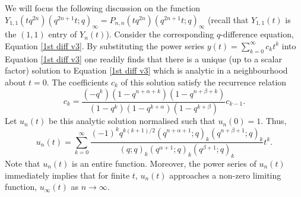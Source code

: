 \documentclass[a4paper,reqno]{amsart}
\numberwithin{equation}{section}
\numberwithin{figure}{section}
\begin{document}
We will focus the following discussion on the function $Y_{1,1}(tq^{2n})(q^{2n+1}t;q)_\infty = P_{n,n}(tq^{2n})(q^{2n+1}t;q)_\infty$ (recall that $Y_{1,1}(t)$ is the $(1,1)$ entry of $Y_n(t)$). Consider the corresponding $q$-difference equation, Equation \eqref{1st diff v3}. By substituting the power series $y(t) = \sum_{k=0}^\infty c_kt^k$ into Equation \eqref{1st diff v3} one readily finds that there is a unique (up to a scalar factor) solution to Equation \eqref{1st diff v3} which is analytic in a neighbourhood about $t=0$. The coefficients $c_k$ of this solution satisfy the recurrence relation
 \begin{equation}\nonumber
     c_k = \frac{(-q^k)(1-q^{n+\alpha+k})(1-q^{n+\beta+k})}{(1-q^k)(1-q^{k+\alpha})(1-q^{k+\beta})}c_{k-1}.
 \end{equation}
Let $u_n(t)$ be this analytic solution normalised such that $u_n(0)=1$. Thus,
\begin{equation}\label{finding F1}
    u_n(t) = \sum_{k=0}^\infty \frac{(-1)^{k}q^{k(k+1)/2} (q^{n+\alpha+1};q)_k (q^{n+\beta+1};q)_k }{(q;q)_k(q^{\alpha+1};q)_k(q^{\beta+1};q)_k}t^k.
\end{equation}
Note that $u_n(t)$ is an entire function.  Moreover, the power series of $u_n(t)$ immediately implies that for finite $t$, $u_n(t)$ approaches a non-zero limiting function, $u_\infty(t)$ as $n\to\infty$. \\
 
\end{document}
